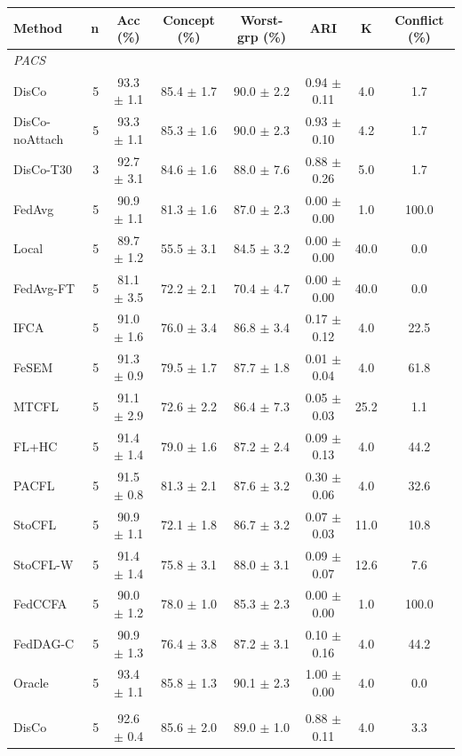 {\scriptsize
\begin{tabular}{l r c c c c c c}
\toprule
Method & n & Acc (\%) & Concept (\%) & Worst-grp (\%) & ARI & K & Conflict (\%) \\
\midrule
\multicolumn{8}{l}{\textit{PACS}} \\
DisCo & 5 & 93.3 $\pm$ 1.1 & 85.4 $\pm$ 1.7 & 90.0 $\pm$ 2.2 & 0.94 $\pm$ 0.11 & 4.0 & 1.7 \\
DisCo-noAttach & 5 & 93.3 $\pm$ 1.1 & 85.3 $\pm$ 1.6 & 90.0 $\pm$ 2.3 & 0.93 $\pm$ 0.10 & 4.2 & 1.7 \\
DisCo-T30 & 3 & 92.7 $\pm$ 3.1 & 84.6 $\pm$ 1.6 & 88.0 $\pm$ 7.6 & 0.88 $\pm$ 0.26 & 5.0 & 1.7 \\
FedAvg & 5 & 90.9 $\pm$ 1.1 & 81.3 $\pm$ 1.6 & 87.0 $\pm$ 2.3 & 0.00 $\pm$ 0.00 & 1.0 & 100.0 \\
Local & 5 & 89.7 $\pm$ 1.2 & 55.5 $\pm$ 3.1 & 84.5 $\pm$ 3.2 & 0.00 $\pm$ 0.00 & 40.0 & 0.0 \\
FedAvg-FT & 5 & 81.1 $\pm$ 3.5 & 72.2 $\pm$ 2.1 & 70.4 $\pm$ 4.7 & 0.00 $\pm$ 0.00 & 40.0 & 0.0 \\
IFCA & 5 & 91.0 $\pm$ 1.6 & 76.0 $\pm$ 3.4 & 86.8 $\pm$ 3.4 & 0.17 $\pm$ 0.12 & 4.0 & 22.5 \\
FeSEM & 5 & 91.3 $\pm$ 0.9 & 79.5 $\pm$ 1.7 & 87.7 $\pm$ 1.8 & 0.01 $\pm$ 0.04 & 4.0 & 61.8 \\
MTCFL & 5 & 91.1 $\pm$ 2.9 & 72.6 $\pm$ 2.2 & 86.4 $\pm$ 7.3 & 0.05 $\pm$ 0.03 & 25.2 & 1.1 \\
FL+HC & 5 & 91.4 $\pm$ 1.4 & 79.0 $\pm$ 1.6 & 87.2 $\pm$ 2.4 & 0.09 $\pm$ 0.13 & 4.0 & 44.2 \\
PACFL & 5 & 91.5 $\pm$ 0.8 & 81.3 $\pm$ 2.1 & 87.6 $\pm$ 3.2 & 0.30 $\pm$ 0.06 & 4.0 & 32.6 \\
StoCFL & 5 & 90.9 $\pm$ 1.1 & 72.1 $\pm$ 1.8 & 86.7 $\pm$ 3.2 & 0.07 $\pm$ 0.03 & 11.0 & 10.8 \\
StoCFL-W & 5 & 91.4 $\pm$ 1.4 & 75.8 $\pm$ 3.1 & 88.0 $\pm$ 3.1 & 0.09 $\pm$ 0.07 & 12.6 & 7.6 \\
FedCCFA & 5 & 90.0 $\pm$ 1.2 & 78.0 $\pm$ 1.0 & 85.3 $\pm$ 2.3 & 0.00 $\pm$ 0.00 & 1.0 & 100.0 \\
FedDAG-C & 5 & 90.9 $\pm$ 1.3 & 76.4 $\pm$ 3.8 & 87.2 $\pm$ 3.1 & 0.10 $\pm$ 0.16 & 4.0 & 44.2 \\
Oracle & 5 & 93.4 $\pm$ 1.1 & 85.8 $\pm$ 1.3 & 90.1 $\pm$ 2.3 & 1.00 $\pm$ 0.00 & 4.0 & 0.0 \\
\addlinespace
\multicolumn{8}{l}{\textit{PACS + QS}} \\
DisCo & 5 & 92.6 $\pm$ 0.4 & 85.6 $\pm$ 2.0 & 89.0 $\pm$ 1.0 & 0.88 $\pm$ 0.11 & 4.0 & 3.3 \\

\end{tabular}}
